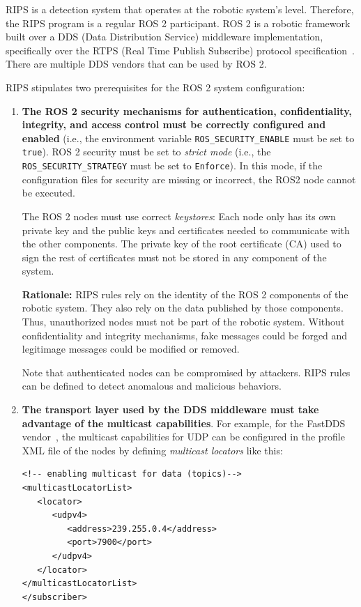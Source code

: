\documentclass[a4paper]{article}
\begin{document}
RIPS is a detection system that operates at the robotic system's level.
Therefore, the RIPS program is a regular ROS 2 participant.
ROS 2 is a robotic framework built over a DDS (Data Distribution Service)
middleware implementation, specifically over the RTPS
(Real Time Publish Subscribe) protocol specification~\cite{rtps-doc}.
There are multiple DDS vendors that can be used by
ROS 2.

RIPS stipulates two prerequisites for the ROS 2 system configuration:

\begin{enumerate}
	\item \textbf{The ROS 2 security mechanisms for authentication, confidentiality,
	integrity,
	and access control must be correctly configured and enabled}
	(i.e., the environment variable
       \texttt{ROS\_SECURITY\_ENABLE} must be set to \texttt{true}).
	ROS 2 security must be set to \textit{strict mode} (i.e., the \texttt{ROS\_SECURITY\_STRATEGY}
	must be set to \texttt{Enforce}). In this mode, if the configuration files
	for security are missing or incorrect, the ROS2 node cannot be executed.

	The ROS 2 nodes must use correct \emph{keystores}: Each node only has its own private key
	and the public keys and certificates needed to communicate with the other components.
	The private key of the root certificate (CA) used to sign the rest of certificates
	must not be stored in any component of the system.

	\textbf{Rationale:} RIPS rules rely on the identity of the ROS 2
	components of the robotic system. They also rely on the data
	published by those components.
	Thus, unauthorized nodes must not be part of the robotic system.
	Without confidentiality and integrity mechanisms, fake messages could be forged
	and legitimage messages could be modified or removed.

	Note that authenticated nodes can be compromised by attackers. RIPS rules can
	be defined to detect anomalous and malicious behaviors.


	\item \textbf{The transport layer used by the DDS middleware must take
	advantage of the multicast capabilities}.
	For example, for the FastDDS vendor~\cite{fastdds-doc}, the multicast
	capabilities for UDP can be configured in the profile
	XML file of the nodes by defining \textit{multicast locators} like this:

{ \scriptsize
\begin{verbatim}
<!-- enabling multicast for data (topics)-->
<multicastLocatorList>
   <locator>
      <udpv4>
         <address>239.255.0.4</address>
         <port>7900</port>
      </udpv4>
   </locator>
</multicastLocatorList>
</subscriber>



\end{verbatim}}
\end{enumerate}
\end{document}
